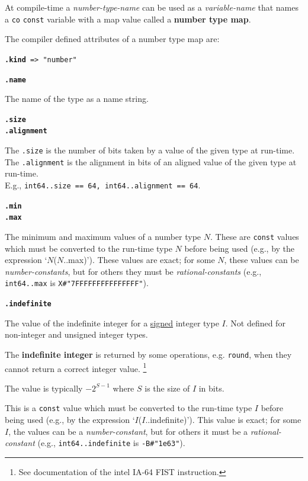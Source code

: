 \documentclass[12pt]{article}
\newcommand{\key}[1]{{\rm \bfseries #1}}
\newcommand{\ttkey}[1]{{\tt \bfseries #1}}
\newenvironment{indpar}[1][0.3in]%
	{\begin{list}{}%
		     {\setlength{\itemsep}{0in}%
		      \setlength{\topsep}{0in}%
		      \setlength{\parsep}{1ex}%
		      \setlength{\labelwidth}{#1}%
		      \setlength{\leftmargin}{#1}%
		      \addtolength{\leftmargin}{\labelsep}}%
	 \item}%
	{\end{list}}
\begin{document}
At compile-time a {\em number-type-name} can be used as a
{\em variable-name} that names a {\tt co} {\tt const} variable
with a map value called a \key{number type map}.

The compiler defined attributes of a number type map are:

{\tt \ttkey{.kind} => "number"}

\ttkey{.name}
\begin{indpar}
The name of the type as a name string.
\end{indpar}

\ttkey{.size} \\
\ttkey{.alignment}
\begin{indpar}\label{SIZE-AND-ALIGNMENT}
The {\tt .size} is the number of bits taken by a value of the given type at
run-time.
The {\tt .alignment} is the alignment in bits
of an aligned value of the given type at
run-time.
\\ E.g., {\tt int64..size == 64, int64..alignment == 64}.
\end{indpar}

\ttkey{.min} \\
\ttkey{.max}
\begin{indpar}
The minimum and maximum values of a number type $N$.
These are {\tt const} values which must be
converted to the run-time type $N$ before being used
(e.g., by the expression `$N$($N$..max)').  These values are exact;
for some $N$, these values can be {\em number-constants}, but
for others they must be {\em rational-constants}
(e.g., {\tt int64..max} is {\tt X\#"7FFFFFFFFFFFFFFF"}).
\end{indpar}

\ttkey{.indefinite}
\begin{indpar}
The value of the indefinite integer for a \underline{signed} integer type $I$.
Not defined for non-integer and unsigned integer types.

The \key{indefinite integer}\label{INDEFINITE-INTEGER} is returned by
some operations, e.g. {\tt round},
when they cannot return a correct integer value.%
\footnote{See documentation of the intel IA-64 FIST instruction.}

The value is typically $-2^{S-1}$ where $S$ is the size of $I$ in bits.

This is a {\tt const} value which must be
converted to the run-time type $I$ before being used
(e.g., by the expression `$I$($I$..indefinite)').  This value is exact;
for some $I$, the values can be a {\em number-constant}, but
for others it must be a {\em rational-constant}
(e.g., {\tt int64..indefinite} is {\tt -B\#"1e63"}).
\end{indpar}
\end{document}
